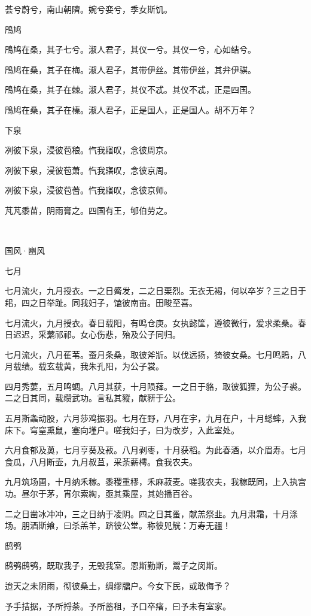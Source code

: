 荟兮蔚兮，南山朝隮。婉兮娈兮，季女斯饥。

鳲鸠

鳲鸠在桑，其子七兮。淑人君子，其仪一兮。其仪一兮，心如结兮。

鳲鸠在桑，其子在梅。淑人君子，其带伊丝。其带伊丝，其弁伊骐。

鳲鸠在桑，其子在棘。淑人君子，其仪不忒。其仪不忒，正是四国。

鳲鸠在桑，其子在榛。淑人君子，正是国人，正是国人。胡不万年？

下泉

冽彼下泉，浸彼苞稂。忾我寤叹，念彼周京。

冽彼下泉，浸彼苞萧。忾我寤叹，念彼京周。

冽彼下泉，浸彼苞蓍。忾我寤叹，念彼京师。

芃芃黍苗，阴雨膏之。四国有王，郇伯劳之。

　


国风·豳风


七月

七月流火，九月授衣。一之日觱发，二之日栗烈。无衣无褐，何以卒岁？三之日于耜，四之日举趾。同我妇子，馌彼南亩。田畯至喜。

七月流火，九月授衣。春日载阳，有鸣仓庚。女执懿筐，遵彼微行，爰求柔桑。春日迟迟，采蘩祁祁。女心伤悲，殆及公子同归。

七月流火，八月萑苇。蚕月条桑，取彼斧斨。以伐远扬，猗彼女桑。七月鸣鵙，八月载绩。载玄载黄，我朱孔阳，为公子裳。

四月秀葽，五月鸣蜩。八月其获，十月陨萚。一之日于貉，取彼狐狸，为公子裘。二之日其同，载缵武功。言私其豵，献豜于公。

五月斯螽动股，六月莎鸡振羽。七月在野，八月在宇，九月在户，十月蟋蟀，入我床下。穹窒熏鼠，塞向墐户。嗟我妇子，曰为改岁，入此室处。

六月食郁及薁，七月亨葵及菽。八月剥枣，十月获稻。为此春酒，以介眉寿。七月食瓜，八月断壶，九月叔苴，采荼薪樗。食我农夫。

九月筑场圃，十月纳禾稼。黍稷重穋，禾麻菽麦。嗟我农夫，我稼既同，上入执宫功。昼尔于茅，宵尔索綯，亟其乘屋，其始播百谷。

二之日凿冰冲冲，三之日纳于凌阴。四之日其蚤，献羔祭韭。九月肃霜，十月涤场。朋酒斯飨，曰杀羔羊，跻彼公堂。称彼兕觥：万寿无疆！

鸱鸮

鸱鸮鸱鸮，既取我子，无毁我室。恩斯勤斯，鬻子之闵斯。

迨天之未阴雨，彻彼桑土，绸缪牖户。今女下民，或敢侮予？

予手拮据，予所捋荼。予所蓄租，予口卒瘏，曰予未有室家。

